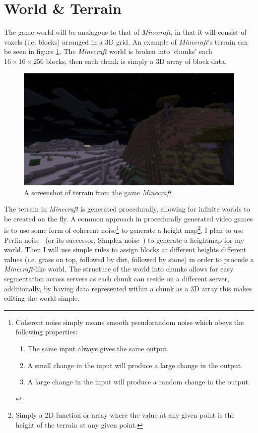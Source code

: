 \documentclass[10pt,twoside,notitlepage,a4paper]{report}
\begin{document}
	\section{World \& Terrain}
	The game world will be analagous to that of \emph{Minecraft}, in that it will consist of voxels (i.e. blocks) arranged in a 3D grid. An example of \emph{Minecraft}'s terrain can be seen in figure \ref{fig:minecraft}. The \emph{Minecraft} world is broken into `chunks' each $16\times16\times256$ blocks, then each chunk is simply a 3D array of block data.
	\begin{figure}
		\includegraphics[width=\textwidth]{minecraft.png}
		\caption{A screenshot of terrain from the game \emph{Minecraft}.}
		\label{fig:minecraft}
	\end{figure}

	The terrain in \emph{Minecraft} is generated procedurally, allowing for infinite worlds to be created on the fly. A common approach in procedurally generated video games is to use some form of coherent noise\footnote{Coherent noise simply means smooth pseudorandom noise which obeys the following properties: \begin{enumerate} \item The same input always gives the same output. \item A small change in the input will produce a large change in the output. \item A large change in the input will produce a random change in the output.\end{enumerate}} to generate a height map\footnote{Simply a 2D function or array where the value at any given point is the height of the terrain at any given point.}. I plan to use Perlin noise~\cite{perlin} (or its successor, Simplex noise~\cite{simplex}) to generate a heightmap for my world. Then I will use simple rules to assign blocks at different heights different values (i.e. grass on top, followed by dirt, followed by stone) in order to procude a \emph{Minecraft}-like world. The structure of the world into chunks allows for easy segmentation across servers as each chunk can reside on a different server, additionally, by having data represented within a chunk as a 3D array this makes editing the world simple.
	
\end{document}

